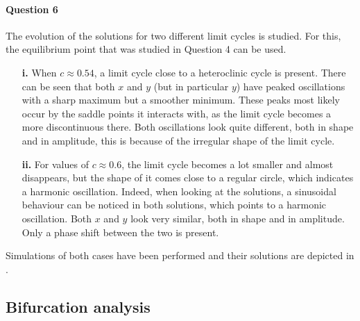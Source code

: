 \documentclass[a4paper,11pt]{article}
\begin{document}
\paragraph{Question 6}\; The evolution of the solutions for two different limit cycles is studied. For this, the equilibrium point that was studied in Question 4 can be used.
\begin{itemize}
	\item[\textbf{i.}] When $c\approx0.54$, a limit cycle close to a heteroclinic cycle is present. There can be seen that both $x$ and $y$
	(but in particular $y$) have peaked oscillations with a sharp maximum but a smoother minimum. These peaks most likely occur by the saddle points it interacts with,
	as the limit cycle becomes a more discontinuous there. Both oscillations look quite different, both in shape and in amplitude, this is because of the 
	irregular shape of the limit cycle. 
	\item[\textbf{ii.}] For values of $c\approx0.6$, the limit cycle becomes a lot smaller and almost disappears, but the shape of it comes close to a regular circle,
	which indicates a harmonic oscillation. Indeed, when looking at the solutions, a sinusoidal behaviour can be noticed in both solutions, which points to a harmonic 
	oscillation. Both $x$ and $y$ look very similar, both in shape and in amplitude. Only a phase shift between the two is present.
\end{itemize}
Simulations of both cases have been performed and their solutions are depicted in .
\subsection{Bifurcation analysis}
\end{document}
